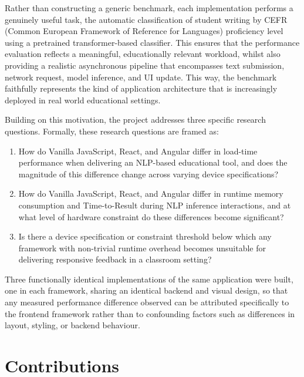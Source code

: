 \documentclass[11pt,a4paper]{report}
\begin{document}
\vspace{5mm}

Rather than constructing a generic benchmark, each implementation performs a genuinely useful task, the automatic classification of student writing by CEFR (Common European Framework of Reference for Languages) proficiency level using a pretrained transformer-based classifier. This ensures that the performance evaluation reflects a meaningful, educationally relevant workload, whilst also providing a realistic asynchronous pipeline that encompasses text submission, network request, model inference, and UI update. This way, the benchmark faithfully represents the kind of application architecture that is increasingly deployed in real world educational settings. 

\vspace{5mm}

Building on this motivation, the project addresses three specific research questions. Formally, these research questions are framed as:

\begin{enumerate}
  \item How do Vanilla JavaScript, React, and Angular differ in load-time
  performance when delivering an NLP-based educational tool, and does the
  magnitude of this difference change across varying device
  specifications?
  \item How do Vanilla JavaScript, React, and Angular differ in runtime
  memory consumption and Time-to-Result during NLP inference interactions,
  and at what level of hardware constraint do these differences become
  significant?
  \item Is there a device specification or constraint threshold below
  which any framework with non-trivial runtime overhead becomes unsuitable
  for delivering responsive feedback in a classroom setting?
\end{enumerate}

Three functionally identical implementations of the same application were built, one in each framework, sharing an identical backend and visual design, so that any measured performance difference observed can be attributed specifically to the frontend framework rather than to confounding factors such as differences in layout, styling, or backend behaviour.

\section{Contributions}
\end{document}
